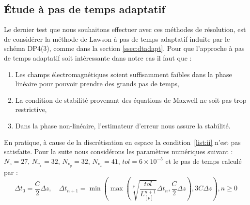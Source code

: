 \subsection{Étude à pas de temps adaptatif}
\label{ssec:3:dtn}

Le dernier test que nous souhaitons effectuer avec ces méthodes de résolution, est de considérer la méthode de Lawson à pas de temps adaptatif induite par le schéma DP4(3), comme dans la section \ref{ssec:dtadapt}. Pour que l'approche à pas de temps adaptatif soit intéressante dans notre cas il faut que :
\begin{enumerate}[label=(\roman*)]
  \item Les champs électromagnétiques soient suffisamment faibles dans la phase linéaire pour pouvoir prendre des grands pas de temps,\label{list:i}
  \item La condition de stabilité provenant des équations de Maxwell ne soit pas trop restrictive,\label{list:ii}
  \item Dans la phase non-linéaire, l'estimateur d'erreur nous assure la stabilité.\label{list:iii}
\end{enumerate}
En pratique, à cause de la discrétisation en espace la condition~\ref{list:ii} n'est pas satisfaite. Pour la suite nous considérons les paramètres numériques suivant : $N_z=27$, $N_{v_x}=32$, $N_{v_y}=32$, $N_{v_z}=41$, $tol=6\times10^{-5}$ et le pas de temps calculé par :
$$
  \Delta t_0 = \frac{C}{2}\Delta z,\quad \Delta t_{n+1} = \min\left( \max\left( \sqrt[p]{\frac{tol}{L_{[p]}^{n+1}}}\Delta t_n ,\frac{C}{2}\Delta z \right) , 3C\Delta z \right), n\geq 0
$$
